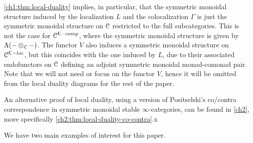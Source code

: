 \begin{remark}
    \label{ch1:rm:monoidal-structure-in-local-duality}
    \cref{ch1:thm:local-duality} implies, in particular, that the symmetric monoidal structure induced by the localization $L$ and the colocalization $\Gamma$ is just the symmetric monoidal structure on $\EuScript{C}$ restricted to the full subcategories. This is not the case for $\EuScript{C}^{\mathcal{K}-comp}$, where the symmetric monoidal structure is given by $\Lambda(-\otimes_{\EuScript{C}}-)$. The functor $V$ also induces a symmetric monoidal structure on $\EuScript{C}^{\mathcal{K}-loc}$, but this coincides with the one induced by $L$, due to their associated endofunctors on $\EuScript{C}$ defining an adjoint symmetric monoidal monad-comonad pair. Note that we will not need or focus on the functor $V$, hence it will be omitted from the local duality diagrams for the rest of the paper. 
\end{remark}

\begin{addendum}
    An alternative proof of local duality, using a version of Positselski's co/contra correspondence in symmetric monoidal stable $\infty$-categories, can be found in \cref{ch2}, more specifically \cref{ch2:thm:local-duality-co-contra}.x 
\end{addendum}

We have two main examples of interest for this paper. 

